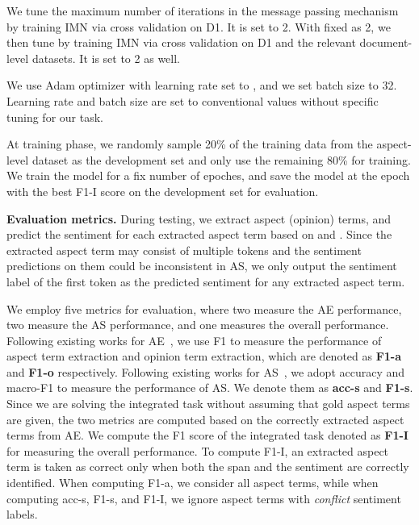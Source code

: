 \documentclass[11pt,a4paper]{article}
\begin{document}
We tune the maximum number of iterations  in the message passing mechanism by training IMN via cross validation on D1. It is set to 2. With  fixed as 2, we then tune  by training IMN via cross validation on D1 and the relevant document-level datasets. It is set to 2 as well. 

We use Adam optimizer with learning rate set to , and we set batch size to 32. Learning rate and batch size are set to conventional values without specific tuning for our task. 

At training phase, we randomly sample 20\% of the training data from the aspect-level dataset as the development set and only use the remaining 80\% for training. We train the model for a fix number of epoches, and save the model at the epoch with the best F1-I score on the development set for evaluation. 
\medskip


\noindent\textbf{Evaluation metrics.} 
During testing, we extract aspect (opinion) terms, and predict the sentiment for each extracted aspect term based on  and . Since the extracted aspect term may consist of multiple tokens and the sentiment predictions on them could be inconsistent in AS, we only output the sentiment label of the first token as the predicted sentiment for any extracted aspect term. 

We employ five metrics for evaluation, where two measure the AE performance, two measure the AS performance, and one measures the overall performance. 
Following existing works for AE~\citep{Wang:17, hu:18}, we use F1 to measure the performance of aspect term extraction and opinion term extraction, which are denoted as \textbf{F1-a} and \textbf{F1-o} respectively. 
Following existing works for AS~\citep{Chen:17, He:18}, we adopt accuracy and macro-F1 to measure the performance of AS. We denote them as \textbf{acc-s} and \textbf{F1-s}. Since we are solving the integrated task without assuming that gold aspect terms are given, the two metrics are computed based on the correctly extracted aspect terms from AE.  
We compute the F1 score of the integrated task denoted as \textbf{F1-I} for measuring the overall performance. To compute F1-I, an extracted aspect term is taken as correct only when both the span and the sentiment are correctly identified. When computing F1-a, we consider all aspect terms, while when computing acc-s, F1-s, and F1-I, we ignore aspect terms with \emph{conflict} sentiment labels.
\end{document}
